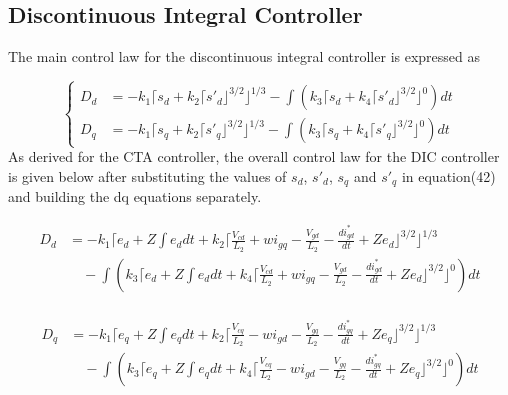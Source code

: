 \documentclass[preprint,12pt]{elsarticle}
\begin{document}
\subsection{Discontinuous Integral Controller}
\label{subsec:dic-inverter}
The main control law for the discontinuous integral controller is expressed as

\begin{equation}
\left\{
\begin{aligned}
    D_d &= -k_1 \Big\lceil s_d + k_2 \lceil {s'}_d \rfloor^{3/2} \Big\rfloor^{1/3}
    - \int \left( k_3 \Big\lceil s_d + k_4 \lceil {s'}_d \rfloor^{3/2} \Big\rfloor^0 \right) dt \\
    D_q &= -k_1 \Big\lceil s_q + k_2 \lceil {s'}_q \rfloor^{3/2} \Big\rfloor^{1/3}
    - \int \left( k_3 \Big\lceil s_q  + k_4 \lceil {s'}_q \rfloor^{3/2} \Big\rfloor^0 \right) dt
\end{aligned}
\right.
\end{equation}
As derived for the CTA controller, the overall control law for the DIC controller is given below after substituting the values of \(s_d\), \(s'_d\), \(s_q\) and \(s'_q\) in equation(42) and building the dq equations separately.

{\small
\begin{equation}
\begin{aligned}
    D_d &= -k_1 \Bigg\lceil e_d + Z \int e_d dt + k_2 \Big\lceil \frac{V_{cd}}{L_2} + w i_{gq} - \frac{V_{gd}}{L_2} - \frac{di^*_{gd}}{dt} + Z e_d \Big\rfloor^{3/2} \Bigg\rfloor^{1/3} \\
    & \quad - \int \left( k_3 \Bigg\lceil e_d + Z \int e_d dt + k_4 \Big\lceil \frac{V_{cd}}{L_2} + w i_{gq} - \frac{V_{gd}}{L_2} - \frac{di^*_{gd}}{dt} + Z e_d \Big\rfloor^{3/2} \Bigg\rfloor^0 \right)dt \\
\end{aligned}
\end{equation}
}

{\small
\begin{equation}
\begin{aligned}
    D_q &= -k_1 \Big\lceil e_q + Z \int e_q dt  + k_2 \Bigg\lceil \frac{V_{cq}}{L_2} - w i_{gd} - \frac{V_{gq}}{L_2} - \frac{di^*_{gq}}{dt} + Z e_q \Big\rfloor^{3/2} \Bigg\rfloor^{1/3} \\
    & \quad - \int \left( k_3 \Bigg\lceil e_q + Z \int e_q dt + k_4 \Big\lceil \frac{V_{cq}}{L_2} - w i_{gd} - \frac{V_{gq}}{L_2} - \frac{di^*_{gq}}{dt} + Z e_q \Big\rfloor^{3/2} \Bigg\rfloor^0 \right) dt
\end{aligned}
\end{equation}
}
\end{document}
